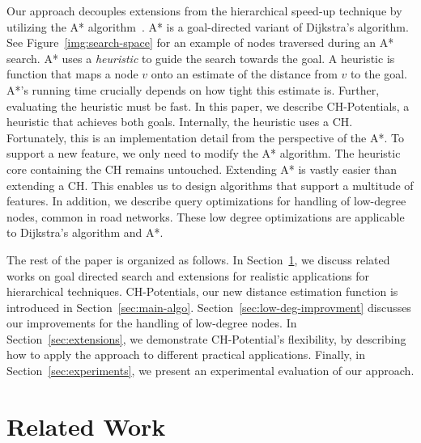 \documentclass[a4paper,USenglish,cleveref, autoref, thm-restate]{lipics-v2019}
\begin{document}
Our approach decouples extensions from the hierarchical speed-up technique by utilizing the A* algorithm~\cite{hnr-afbhd-68}.
A* is a goal-directed variant of Dijkstra's algorithm.
See Figure~\ref{img:search-space} for an example of nodes traversed during an A* search.
A* uses a \emph{heuristic} to guide the search towards the goal.
A heuristic is function that maps a node $v$ onto an estimate of the distance from $v$ to the goal.
A*'s running time crucially depends on how tight this estimate is.
Further, evaluating the heuristic must be fast.
In this paper, we describe CH-Potentials, a heuristic that achieves both goals.
Internally, the heuristic uses a CH.
Fortunately, this is an implementation detail from the perspective of the A*.
To support a new feature, we only need to modify the A* algorithm.
The heuristic core containing the CH remains untouched.
Extending A* is vastly easier than extending a CH.
This enables us to design algorithms that support a multitude of features.
In addition, we describe query optimizations for handling of low-degree nodes, common in road networks.
These low degree optimizations are applicable to Dijkstra's algorithm and A*.

The rest of the paper is organized as follows.
In Section~\ref{sec:related_work}, we discuss related works on goal directed search and extensions for realistic applications for hierarchical techniques.
CH-Potentials, our new distance estimation function is introduced in Section~\ref{sec:main-algo}.
Section~\ref{sec:low-deg-improvment} discusses our improvements for the handling of low-degree nodes.
In Section~\ref{sec:extensions}, we demonstrate CH-Potential's flexibility, by describing how to apply the approach to different practical applications.
Finally, in Section~\ref{sec:experiments}, we present an experimental evaluation of our approach.

\section{Related Work}\label{sec:related_work}
\end{document}
